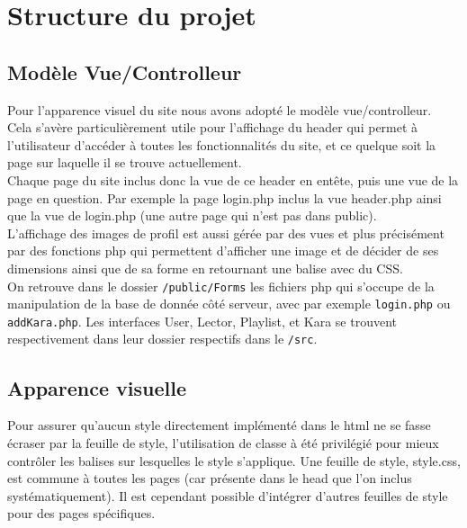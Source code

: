 \section{Structure du projet}
\subsection{Modèle Vue/Controlleur}
Pour l'apparence visuel du site nous avons adopté le modèle vue/controlleur. \\
Cela s'avère particulièrement utile pour l'affichage du header qui permet à l'utilisateur d'accéder à toutes les fonctionnalités du site, et ce quelque soit la page sur laquelle il se trouve actuellement.\\
Chaque page du site inclus donc la vue de ce header en entête, puis une vue de la page en question.
Par exemple la page login.php inclus la vue header.php ainsi que la vue de login.php (une autre page qui n'est pas dans public).\\
L'affichage des images de profil est aussi gérée par des vues et plus précisément par des fonctions php qui permettent d'afficher une image et de décider de ses dimensions ainsi que de sa forme en retournant une balise avec du CSS.\\
On retrouve dans le dossier \texttt{/public/Forms} les fichiers php qui s'occupe de la manipulation de la base de donnée côté serveur, avec par exemple \texttt{login.php} ou \texttt{addKara.php}.\newline
Les interfaces User, Lector, Playlist, et Kara se trouvent respectivement dans leur dossier respectifs dans le \texttt{/src}.


\subsection{Apparence visuelle}
Pour assurer qu'aucun style directement implémenté dans le html ne se fasse écraser par la feuille de style, l'utilisation de classe à été privilégié pour mieux contrôler les balises sur lesquelles le style s'applique. Une feuille de style, style.css, est commune à toutes les pages (car présente dans le head que l'on inclus systématiquement). Il est cependant possible d'intégrer d'autres feuilles de style pour des pages spécifiques.

